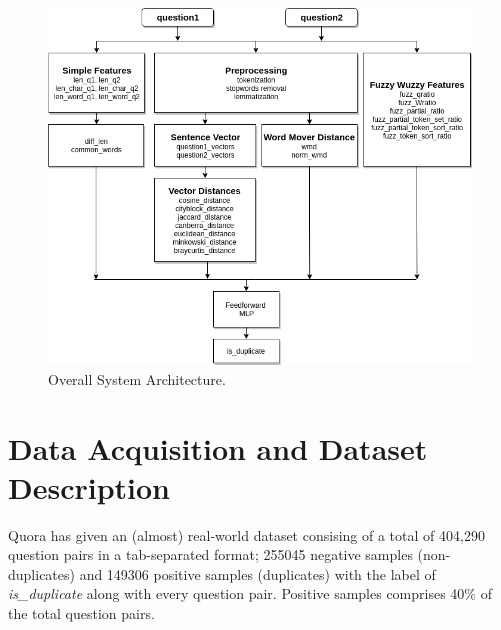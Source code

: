 \begin{figure}[H]
\begin{center}
	\includegraphics[width = 5.7in]{images/arch.png}
	\caption{Overall System Architecture.}
\end{center}
\end{figure}


\section{Data Acquisition and Dataset Description}
Quora has given an (almost) real-world dataset\cite{dataset} consising of a total of 404,290 question pairs in a tab-separated format; 255045 negative samples (non-duplicates) and 149306 positive samples (duplicates)  with the label of \textit{is\_duplicate} along with every question pair. Positive samples comprises 40\% of the total question pairs.


